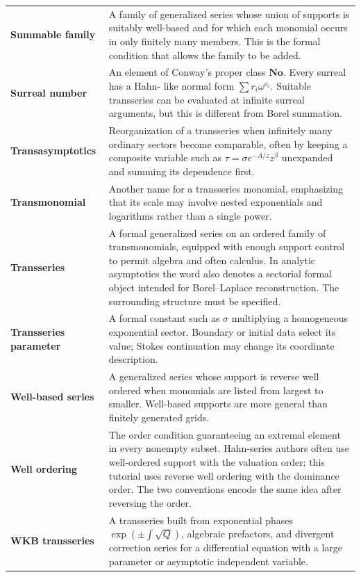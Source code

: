 \documentclass[11pt,openany]{book}
\theoremstyle{definition}
\theoremstyle{plain}
\theoremstyle{remark}
\begin{document}
\begin{longtable}{@{}p{}p{}@{}}
\textbf{Summable family}\index{summable family}
& A family of generalized series whose union of supports is suitably
well-based and for which each monomial occurs in only finitely many members.
This is the formal condition that allows the family to be added.\\

\textbf{Surreal number}\index{surreal number}
& An element of Conway's proper class $\mathbf{No}$. Every surreal has a Hahn-
like normal form $\sum r_i\omega^{a_i}$. Suitable transseries can be evaluated
at infinite surreal arguments, but this is different from Borel summation.\\

\textbf{Transasymptotics}\index{transasymptotics}
& Reorganization of a transseries when infinitely many ordinary sectors
become comparable, often by keeping a composite variable such as
$\tau=\sigma e^{-A/z}z^\beta$ unexpanded and summing its dependence first.\\

\textbf{Transmonomial}\index{transmonomial}
& Another name for a transseries monomial, emphasizing that its scale may
involve nested exponentials and logarithms rather than a single power.\\

\textbf{Transseries}\index{transseries}
& A formal generalized series on an ordered family of transmonomials, equipped
with enough support control to permit algebra and often calculus. In analytic
asymptotics the word also denotes a sectorial formal object intended for
Borel--Laplace reconstruction. The surrounding structure must be specified.\\

\textbf{Transseries parameter}\index{transseries parameter}
& A formal constant such as $\sigma$ multiplying a homogeneous exponential
sector. Boundary or initial data select its value; Stokes continuation may
change its coordinate description.\\

\textbf{Well-based series}\index{well-based series}
& A generalized series whose support is reverse well ordered when monomials
are listed from largest to smaller. Well-based supports are more general than
finitely generated grids.\\

\textbf{Well ordering}\index{well ordering}
& The order condition guaranteeing an extremal element in every nonempty
subset. Hahn-series authors often use well-ordered support with the valuation
order; this tutorial uses reverse well ordering with the dominance order.
The two conventions encode the same idea after reversing the order.\\

\textbf{WKB transseries}\index{WKB transseries}
& A transseries built from exponential phases $\exp(\pm\int\sqrt Q)$,
algebraic prefactors, and divergent correction series for a differential
equation with a large parameter or asymptotic independent variable.\\

\end{longtable}
\renewcommand{\arraystretch}{1}
\end{document}
